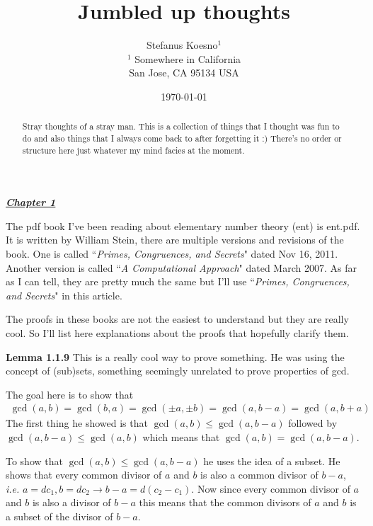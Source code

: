 \documentclass[aps,preprint,preprintnumbers,nofootinbib,showpacs,prd]{revtex4-1}
\newcommand{\ie}{{\it i.e.} }
\newcommand{\nbea}{\begin{eqnarray*}}
\newcommand{\neea}{\end{eqnarray*}}
\begin{document}
\title{Jumbled up thoughts}
\bigskip
\author{Stefanus Koesno$^1$\\
$^1$ Somewhere in California\\ San Jose, CA 95134 USA\\
}
%
\date{\today}
%
\begin{abstract}
Stray thoughts of a stray man. This is a collection of things that I thought was fun to do and also things that I always come back to after forgetting it :) There's no order or structure here just whatever my mind facies at the moment.

\end{abstract}
%
\maketitle

\renewcommand{\theequation}{A.\arabic{equation}}  %
\setcounter{equation}{0}  %

\underline{\textbf{\textit{Chapter 1}}}
\bigskip

The pdf book I've been reading about elementary number theory (ent) is ent.pdf. It is written by William Stein, there are multiple versions and revisions of the book. One is called ``{\it Primes, Congruences, and Secrets}" dated Nov 16, 2011. Another version is called ``{\it A Computational Approach}" dated March 2007. As far as I can tell, they are pretty much the same but I'll use ``{\it Primes, Congruences, and Secrets}" in this article.

The proofs in these books are not the easiest to understand but they are really cool. So I'll list here explanations about the proofs that hopefully clarify them.

{\bf Lemma 1.1.9} This is a really cool way to prove something. He was using the concept of (sub)sets, something seemingly unrelated to prove properties of gcd.

The goal here is to show that 
%
\nbea
\gcd(a,b) = \gcd(b,a) = \gcd(\pm a,\pm b) = \gcd(a,b-a) = \gcd(a,b+a)
\neea
%
The first thing he showed is that $\gcd(a,b) \le \gcd(a,b-a)$ followed by $\gcd(a,b-a) \le \gcd(a,b)$ which means that $\gcd(a,b) = \gcd(a,b-a)$.

To show that $\gcd(a,b) \le \gcd(a,b-a)$ he uses the idea of a subset. He shows that every common divisor of $a$ and $b$ is also a common divisor of $b-a$, \ie $a = d c_1, b=d c_2 \to b-a = d(c_2-c_1)$. Now since every common divisor of $a$ and $b$ is also a divisor of $b-a$ this means that the common divisors of $a$ and $b$ is a subset of the divisor of $b-a$.
\end{document}
